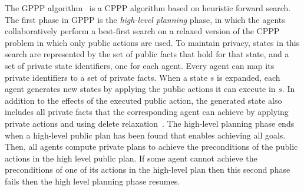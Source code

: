 \documentclass[letterpaper]{article}
\theoremstyle{definition}
\begin{document}
The GPPP algorithm~\citep{maliah2016collaborative} is a CPPP algorithm based on heuristic forward search. %
The first phase in GPPP is the {\em high-level planning} phase, in which the agents collaboratively perform a best-first search on a relaxed version of the CPPP problem in which only public actions are used. To maintain privacy, states in this search are represented by the set of public facts that hold for that state, and a set of private state identifiers, one for each agent. Every agent can map its private identifiers to a set of private facts. 
When a state $s$ is expanded, each agent generates new states by applying the public actions it can execute in $s$. In addition to the effects of the executed public action, the generated state also includes all private facts that the corresponding agent can achieve by applying private actions and using delete relaxation~\citep{hoffmann2001ff}. 
The high-level planning phase ends when a high-level public plan has been found that enables achieving all goals. Then, all agents compute private plans to achieve the preconditions of the public actions in the high level public plan. If some agent cannot achieve the preconditions of one of its actions in the high-level plan then this second phase fails then the high level planning phase resumes.


\end{document}
